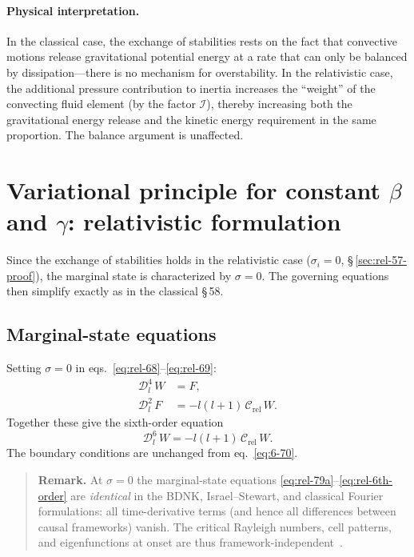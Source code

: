 \paragraph{Physical interpretation.}
In the classical case, the exchange of stabilities rests on the fact
that convective motions release gravitational potential energy at a rate
that can only be balanced by dissipation---there is no mechanism for
overstability.  In the relativistic case, the additional pressure
contribution to inertia increases the ``weight'' of the convecting
fluid element (by the factor $\mathcal{I}$), thereby increasing both
the gravitational energy release and the kinetic energy requirement in
the same proportion.  The balance argument is unaffected.


\section{Variational principle for constant $\beta$ and $\gamma$:
relativistic formulation}
\label{sec:rel-58}

Since the exchange of stabilities holds in the relativistic case
($\sigma_{i} = 0$, \S\,\ref{sec:rel-57-proof}), the marginal state is
characterized by $\sigma = 0$.  The governing equations then simplify
exactly as in the classical \S\,58.

\subsection{Marginal-state equations}
\label{sec:rel-58-marginal}

Setting $\sigma = 0$ in eqs.~\eqref{eq:rel-68}--\eqref{eq:rel-69}:
\begin{align}
  \mathscr{D}_{l}^{4}\,W &= F,
  \label{eq:rel-79a}\\[4pt]
  \mathscr{D}_{l}^{2}\,F
    &= -l(l+1)\,\mathcal{C}_{\mathrm{rel}}\,W.
  \label{eq:rel-80}
\end{align}
Together these give the sixth-order equation
\begin{equation}
  \mathscr{D}_{l}^{6}\,W
  = -l(l+1)\,\mathcal{C}_{\mathrm{rel}}\,W.
  \label{eq:rel-6th-order}
\end{equation}
The boundary conditions are unchanged from eq.~\eqref{eq:6-70}.

\begin{quote}
\textbf{Remark.}  At $\sigma = 0$ the marginal-state equations
\eqref{eq:rel-79a}--\eqref{eq:rel-6th-order} are \emph{identical}
in the BDNK, Israel--Stewart, and classical Fourier formulations:
all time-derivative terms (and hence all differences between
causal frameworks) vanish.  The critical Rayleigh numbers, cell
patterns, and eigenfunctions at onset are thus
framework-independent~\cite{BemficaDN2018,Kovtun2019}.
\end{quote}

